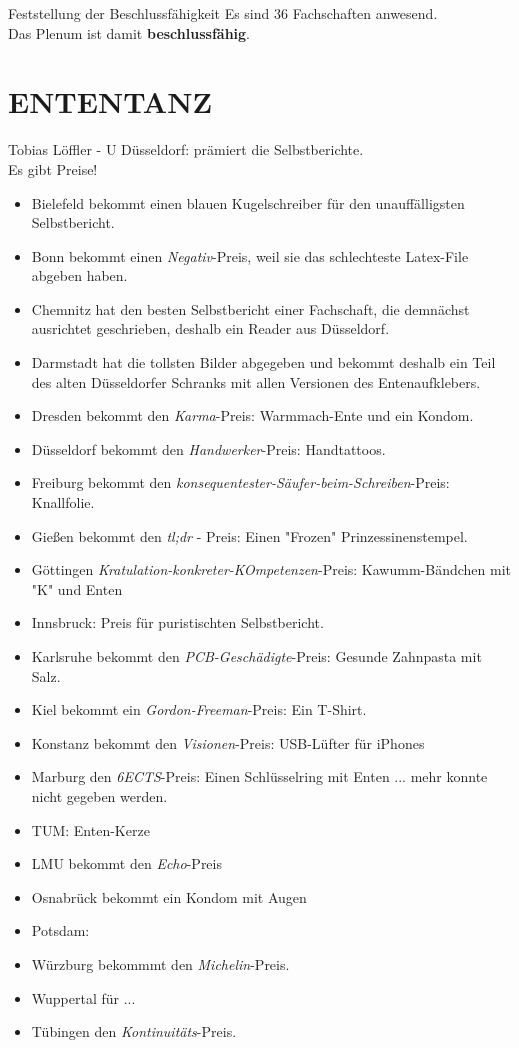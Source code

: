     \begin{success}{Feststellung der Beschlussfähigkeit}
      Es sind 36 Fachschaften anwesend. \\
      Das Plenum ist damit \textbf{beschlussfähig}.
    \end{success}


\section{ENTENTANZ}
  Tobias Löffler - U Düsseldorf:  prämiert die Selbstberichte. \\
  Es gibt Preise!
  \begin{itemize}
    \item Bielefeld bekommt einen blauen Kugelschreiber für den unauffälligsten Selbstbericht.
    \item Bonn bekommt einen \textit{Negativ}-Preis, weil sie das schlechteste Latex-File abgeben haben.
    \item Chemnitz hat den besten Selbstbericht einer Fachschaft, die demnächst ausrichtet geschrieben, deshalb ein Reader aus Düsseldorf.
    \item Darmstadt hat die tollsten Bilder abgegeben und bekommt deshalb ein Teil des alten Düsseldorfer Schranks mit allen Versionen des Entenaufklebers.
    \item Dresden bekommt den \textit{Karma}-Preis: Warmmach-Ente und ein Kondom.
    \item Düsseldorf bekommt den \textit{Handwerker}-Preis: Handtattoos.
    \item Freiburg bekommt den \textit{konsequentester-Säufer-beim-Schreiben}-Preis: Knallfolie.
    \item Gießen bekommt den \textit{tl;dr} - Preis: Einen "Frozen" Prinzessinenstempel.
    \item Göttingen \textit{Kratulation-konkreter-KOmpetenzen}-Preis: Kawumm-Bändchen mit "K" und Enten
    \item Innsbruck: Preis für puristischten Selbstbericht.
    \item Karlsruhe bekommt den \textit{PCB-Geschädigte}-Preis: Gesunde Zahnpasta mit Salz.
    \item Kiel bekommt ein \textit{Gordon-Freeman}-Preis: Ein T-Shirt.
    \item Konstanz bekommt den \textit{Visionen}-Preis: USB-Lüfter für iPhones
    \item Marburg den \textit{6ECTS}-Preis: Einen Schlüsselring mit Enten ... mehr konnte nicht gegeben werden.
    \item TUM: Enten-Kerze
    \item LMU bekommt den \textit{Echo}-Preis
    \item Osnabrück bekommt ein Kondom mit Augen
    \item Potsdam:
    \item Würzburg bekommmt den \textit{Michelin}-Preis.
    \item Wuppertal für ...
    \item Tübingen den \textit{Kontinuitäts}-Preis.
  \end{itemize}


